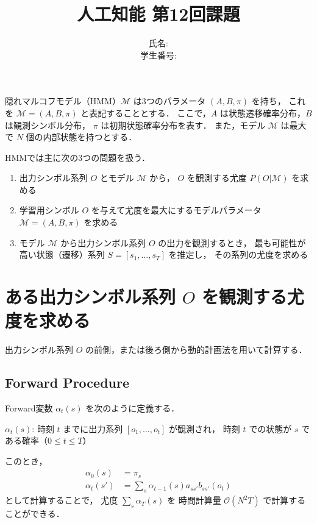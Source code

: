 \documentclass[a4paper, lualatex, ja=standard]{bxjsarticle}
\title{人工知能 第12回課題}
\author{氏名:  \\ 学生番号: }
\begin{document}
\maketitle

隠れマルコフモデル（HMM）$\mathcal{M}$ は3つのパラメータ $(A,B,\pi)$ を持ち，
これを $\mathcal{M}=(A,B,\pi)$ と表記することとする．
ここで，$A$ は状態遷移確率分布，$B$ は観測シンボル分布，
$\pi$ は初期状態確率分布を表す．
また，モデル $\mathcal{M}$ は最大で $N$ 個の内部状態を持つとする．

HMMでは主に次の3つの問題を扱う．

\begin{enumerate}
\item
  出力シンボル系列 $O$ とモデル $\mathcal{M}$ から，
  $O$ を観測する尤度 $P(O|\mathcal{M})$ を求める

\item
  学習用シンボル $O$ を与えて尤度を最大にするモデルパラメータ
  $\mathcal{M}=(A,B,\pi)$ を求める

\item
  モデル $\mathcal{M}$ から出力シンボル系列 $O$ の出力を観測するとき，
  最も可能性が高い状態（遷移）系列 $S=[s_{1},\dots,s_{T}]$ を推定し，
  その系列の尤度を求める
\end{enumerate}

\section{ある出力シンボル系列 $O$ を観測する尤度を求める}

出力シンボル系列 $O$ の前側，または後ろ側から動的計画法を用いて計算する．

\subsection{Forward Procedure}

Forward変数 $\alpha_{t}(s)$ を次のように定義する．
\begin{dfntcb}
$\alpha_{t}(s)$: 時刻 $t$ までに出力系列 $[o_{1},\dots,o_{t}]$ が観測され，
時刻 $t$ での状態が $s$ である確率（$0 \leq t \leq T$）
\end{dfntcb}

このとき，
\begin{align*}
\alpha_{0}(s) &= \pi_{s} \\
\alpha_{t}(s') &= \sum_{s}\alpha_{t-1}(s)a_{ss'}b_{ss'}(o_{t})
\end{align*}
として計算することで，
尤度 $\sum_{s}\alpha_{T}(s)$ を
時間計算量 $\mathcal{O}(N^{2} T)$ で計算することができる．
\end{document}
